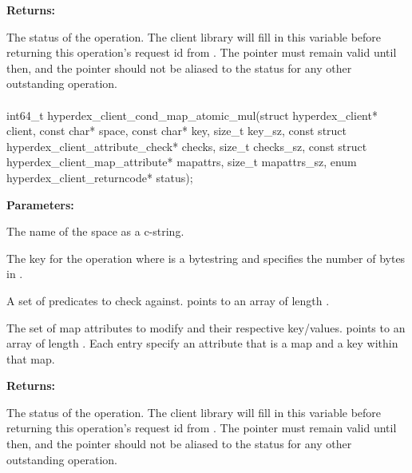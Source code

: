 \noindent\textbf{Returns:}
\begin{description}[labelindent=\widthof{{\code{status}}},leftmargin=*,noitemsep,nolistsep,align=right]
\item[\code{status}] The status of the operation.  The client library will fill in this variable before returning this operation's request id from .  The pointer must remain valid until then, and the pointer should not be aliased to the status for any other outstanding operation.
\end{description}

\paragraph{}
\begin{ccode}
int64_t hyperdex_client_cond_map_atomic_mul(struct hyperdex_client* client,
                const char* space,
                const char* key, size_t key_sz,
                const struct hyperdex_client_attribute_check* checks, size_t checks_sz,
                const struct hyperdex_client_map_attribute* mapattrs, size_t mapattrs_sz,
                enum hyperdex_client_returncode* status);
\end{ccode}
\funcdesc 

\noindent\textbf{Parameters:}
\begin{description}[labelindent=\widthof{{\code{mapattrs}, \code{mapattrs\_sz}}},leftmargin=*,noitemsep,nolistsep,align=right]
\item[\code{space}] The name of the space as a c-string.
\item[\code{key}, \code{key\_sz}] The key for the operation where  is a bytestring and  specifies the number of bytes in .
\item[\code{checks}, \code{checks\_sz}] A set of predicates to check against.   points to an array of length .
\item[\code{mapattrs}, \code{mapattrs\_sz}] The set of map attributes to modify and their respective key/values.   points to an array of length .  Each entry specify an attribute that is a map and a key within that map.
\end{description}

\noindent\textbf{Returns:}
\begin{description}[labelindent=\widthof{{\code{status}}},leftmargin=*,noitemsep,nolistsep,align=right]
\item[\code{status}] The status of the operation.  The client library will fill in this variable before returning this operation's request id from .  The pointer must remain valid until then, and the pointer should not be aliased to the status for any other outstanding operation.
\end{description}

